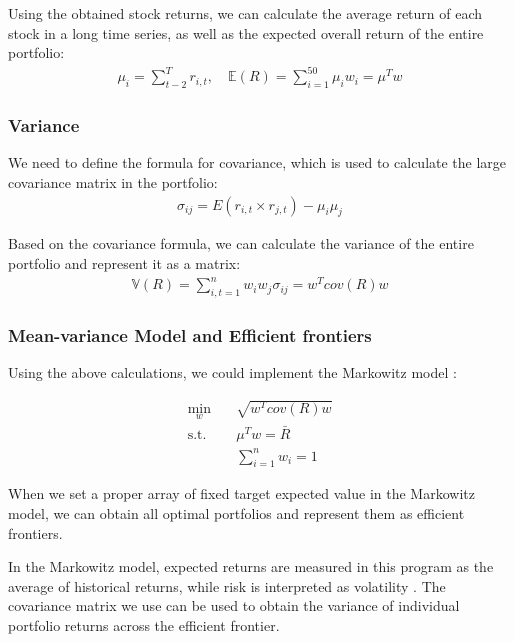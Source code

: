 \documentclass[default,iicol]{sn-jnl}%
\begin{document}
Using the obtained stock returns, we can calculate the average return of each stock in a long time series, as well as the expected overall return of the entire portfolio: 
\begin{align}
	\mu _{i}=\sum_{t-2}^{T}r_{i,t}, \hspace{1em}\mathbb{E}(R)=\sum_{i=1}^{50}\mu_{i}w _{i}=\mu ^{T}w  
	\label{eq2}
\end{align}
\subsubsection{Variance}\label{sec3sub2ssub2}
\hspace{1.5em}We need to define the formula for covariance, which is used to calculate the large covariance matrix in the portfolio:
\begin{align}
	\sigma _{ij} =E(r_{i,t}\times r_{j,t})-\mu_{i}\mu_{j}
	\label{eq3}
\end{align}

Based on the covariance formula, we can calculate the variance of the entire portfolio and represent it as a matrix:
\begin{align}
	\mathbb{V}(R)=\sum_{i,t=1}^{n} w_{i} w _{j}\sigma _{ij} =w ^{T}cov(R)w  
	\label{eq4}
\end{align}

\subsubsection{Mean-variance Model and Efficient frontiers}\label{sec3sub2ssub3}
\hspace{1.5em}Using the above calculations, we could implement the Markowitz model \cite{1952Portfolio}:

\begin{equation}
\begin{aligned}
	\min_{w } \quad &\sqrt{w^{T} cov(R)w } \\
	\textrm{s.t.}  \quad & \mu^{T}w = \bar{R} \\
	& \sum_{i=1}^{n}w_{i}=1 
	\label{eq5}
\end{aligned}
\end{equation}

When we set a proper array of fixed target expected value in the Markowitz model, we can obtain all optimal portfolios and represent them as efficient frontiers.

In the Markowitz model, expected returns are measured in this program as the average of historical returns, while risk is interpreted as volatility \cite{2009Investment}. The covariance matrix we use can be used to obtain the variance of individual portfolio returns across the efficient frontier.
\end{document}
